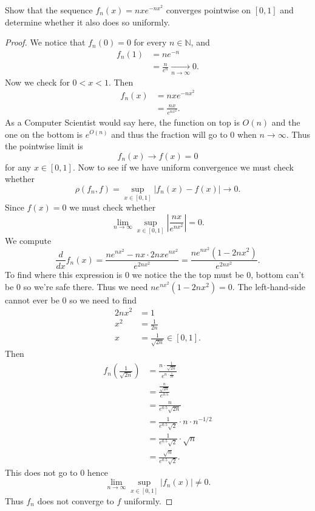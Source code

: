 \begin{prob}
    Show that the sequence $f_n(x) = nxe^{-nx^2}$ converges 
    pointwise on $[0,1]$ and determine whether it 
    also does so uniformly.
\end{prob}
\begin{proof}
    We notice that 
    $f_n(0) = 0$ for every $n \in \mathbb N$, and 
    \begin{align*}
        f_n(1) 
        &= ne^{-n}  
        \\ 
        &= \frac{n}{e^n} \underset{n\to\infty}{\to} 0. 
    \end{align*}
    Now we check for $0 < x < 1$. Then 
    \begin{align*}
        f_n(x) 
        &= nxe^{-nx^2} \\ 
        &= \frac{nx}{e^{nx^2}}. 
    \end{align*}
    As a Computer Scientist would say here, the 
    function on top is $O(n)$ and the one on the bottom 
    is $e^{O(n)}$ and thus the fraction will go to $0$ when 
    $n \to \infty$. Thus the pointwise limit is 
    \[
        f_n(x) \to f(x) = 0 
    \]
    for any $x \in [0,1]$. 
    Now to see if we have uniform convergence we must check whether 
    \[
        \rho(f_n,f) = \sup_{x\in[0,1]}|f_n(x) - f(x)| \to 0.
    \]
    Since $f(x) = 0$ we must check whether 
    \[
        \lim_{n\to\infty}\sup_{x\in[0,1]}
        \left|\frac{nx}{e^{nx^2}}\right| = 0.
    \]
    We compute 
    \[
        \frac{d}{dx}f_n(x) = 
        \frac{ne^{nx^2} - nx \cdot 
        2nxe^{nx^2}}{e^{2nx^2}}
        = \frac{ne^{nx^2}(1 - 2nx^2)}{e^{2nx^2}}.
    \]
    To find where this expression is $0$ we notice the 
    the top must be $0$, bottom can't be $0$ so we're safe there. 
    Thus we need $ne^{nx^2}(1-2nx^2) = 0$. The left-hand-side cannot
    ever be $0$ so we need to find 
    \begin{align*}
        2nx^2 &= 1 \\ 
        x^2 &= \frac{1}{2n} \\ 
        x &= \frac{1}{\sqrt{2n}} \in [0,1].
    \end{align*}
    Then 
    \begin{align*}
        f_n\left(\frac{1}{\sqrt{2n}}\right)
        &= \frac{n\cdot \frac{1}{\sqrt{2n}}}{e^{n\cdot \frac{1}{2n}}} 
        \\ 
        &= 
        \frac{\frac{n}{\sqrt{2n}}}{e^{0.5}}
        \\ 
        &= \frac{n}{e^{0.5}\sqrt{2n}} \\ 
        &= \frac{1}{e^{0.5}\sqrt{2}}\cdot n \cdot n^{-1/2} \\ 
        &= \frac{1}{e^{0.5}\sqrt2}\cdot \sqrt{n} \\ 
        &= \frac{\sqrt n}{e^{0.5}\sqrt 2}.
    \end{align*}
    This does not go to $0$ hence 
    \[
        \lim_{n\to\infty}\sup_{x\in[0,1]}\left|f_n(x)\right| \neq 0.
    \]
    Thus $f_n$ does not converge to $f$ uniformly.
\end{proof}

